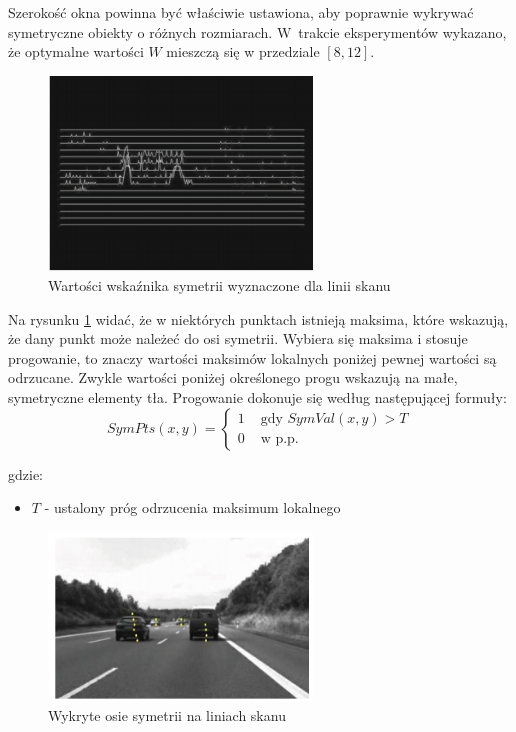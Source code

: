 Szerokość okna powinna być właściwie ustawiona, aby poprawnie wykrywać symetryczne obiekty o różnych rozmiarach. 
W~trakcie eksperymentów wykazano, że optymalne wartości $W$ mieszczą się w przedziale $[8,12]$. %

\begin{figure}
  \centering
  \includegraphics[width=7cm]{img/tl_peaks.png}
  \caption{Wartości wskaźnika symetrii wyznaczone dla linii skanu\cite{T1}}
  \label{fig:car_scan_lines}
\end{figure}

Na rysunku \ref{fig:car_scan_lines} widać, że w niektórych punktach istnieją maksima, które wskazują, że dany punkt może należeć do osi symetrii. 
Wybiera się maksima i stosuje progowanie, to znaczy wartości maksimów lokalnych poniżej pewnej wartości są odrzucane. %
Zwykle wartości poniżej określonego progu wskazują na małe, symetryczne elementy tła. 
Progowanie dokonuje się według następującej formuły:
\begin{equation}
SymPts(x,y)=\begin{cases}
1 & \text{ gdy } SymVal(x,y)>T\\ 
0 & \text{ w p.p.}
\end{cases}
\end{equation}

gdzie:
\begin{itemize}
\item $T$ - ustalony próg odrzucenia maksimum lokalnego
\end{itemize}


\begin{figure}
  \centering
  \includegraphics[width=7cm]{img/car_symmetry.png}
  \caption{Wykryte osie symetrii na liniach skanu\cite{T1}}
  \label{fig:car_detected}
\end{figure}

